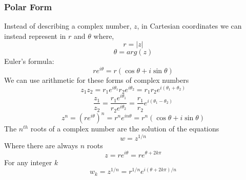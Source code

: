 \documentclass[11pt,titlepage]{article}
\numberwithin{equation}{section}
\begin{document}
\subsubsection{Polar Form}
Instead of describing a complex number, $z$, in Cartesian coordinates we can instead represent in $r$ and $\theta$ where,
$$r=|z|$$
$$\theta=arg(z)$$
Euler's formula:
$$re^{i\theta}=r(\cos \theta+i\sin \theta)$$
We can use arithmetic for these forms of complex numbers
$$z_{1}z_{2}=r_{1}e^{i\theta_{1}}r_{2}e^{i\theta_{2}}=r_{1}r_{2}e^{i(\theta_{1}+\theta_{2})}$$
$$\frac{z_{1}}{z_{2}}=\frac{r_{1}e^{i\theta_{1}}}{r_{2}e^{i\theta_{2}}}=\frac{r_{1}}{r_{2}}e^{i(\theta_{1}-\theta_{2})}$$
$$z^n=(re^{i\theta})^n=r^ne^{in\theta}=r^n(\cos \theta +i\sin \theta)$$
The $n^{th}$ roots of a complex number are the solution of the equations 
$$w=z^{1/n}$$
Where there are always $n$ roots
$$z=re^{i \theta}=re^{\theta+2k\pi}$$For any integer $k$
$$w_{k}=z^{1/n}=r^{1/n}e^{i(\theta+2k\pi)/n}$$
\end{document}
